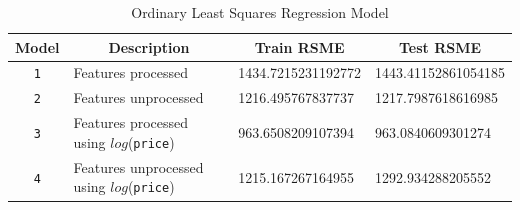 \documentclass[11pt,letterpaper]{article}
\begin{document}
\begin{table}[H]
    \centering
    \begin{tabular}{clll}
        \hline
    Model & \multicolumn{1}{c}{Description} & \multicolumn{1}{c}{Train RSME} & \multicolumn{1}{c}{Test RSME} \\
    \hline
    \texttt{1}     & Features processed              & 1434.7215231192772                                                     & 1443.41152861054185                                                      \\
    \texttt{2}     & Features unprocessed            & 1216.495767837737                                                       & 1217.7987618616985                                                      \\
    \texttt{3}     & Features processed using $log$(\texttt{price})   & 963.6508209107394                                                      & 963.0840609301274                                                       \\
    \texttt{4}     & Features unprocessed using $log$(\texttt{price}) & 1215.167267164955                                                      & 1292.934288205552                                                      
    \end{tabular}
    \caption{Ordinary Least Squares Regression Model}
    \end{table}
\end{document}
